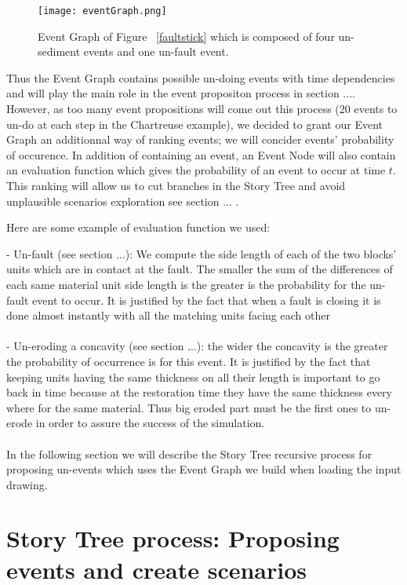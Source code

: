 \documentclass[12pt, a4paper]{report} %
\begin{document}
	\begin{figure}[H]
	\centering
	\texttt{[image: eventGraph.png]}
	\caption{ Event Graph of Figure ~\ref{faultstick} which is composed of four un-sediment events and one un-fault event.}
	\label{eventGraph}
	\end{figure}

Thus the Event Graph contains possible un-doing events with time dependencies and will play the main role in the event propositon process in section .... However, as too many event propositions will come out this process (20 events to un-do at each step in the Chartreuse example), we decided to grant our Event Graph an additionnal way of ranking events; we will concider events' probability of occurence. In addition of containing an event, an Event Node will also contain an evaluation function which gives the probability of an event to occur at time $t$. This ranking will allow us to cut branches in the Story Tree and avoid unplausible scenarios exploration see section ...
.

Here are some example of evaluation function we used:

 - Un-fault (see section ...): We compute the side length of each of the two blocks' units which are in contact at the fault. The smaller the sum of the differences of each same material unit side length is the greater is the probability for the un-fault event to occur. It is justified by the fact that when a fault is closing it is done almost instantly with all the matching units facing each other\\\\
 
 - Un-eroding a concavity (see section ...): the wider the concavity is the greater the probability of occurrence is for this event. It is justified by the fact that keeping units having the same thickness on all their length is important to go back in time because at the restoration time they have the same thickness every where for the same material. Thus big eroded part must be the first ones to un-erode in order to assure the success of the simulation.\\\\

In the following section we will describe the Story Tree recursive process for proposing un-events which uses the Event Graph we build when loading the input drawing.

\section{Story Tree process: Proposing events and create scenarios} 
\end{document}
